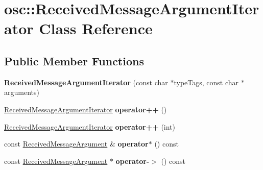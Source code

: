 \hypertarget{classosc_1_1_received_message_argument_iterator}{}\section{osc\+:\+:Received\+Message\+Argument\+Iterator Class Reference}
\label{classosc_1_1_received_message_argument_iterator}
\subsection*{Public Member Functions}
\begin{DoxyCompactItemize}
\item 
\mbox{\label{classosc_1_1_received_message_argument_iterator_ad5a73ceee1761f58729c0acd4f524b57}} 
{\bfseries Received\+Message\+Argument\+Iterator} (const char $\ast$type\+Tags, const char $\ast$arguments)
\item 
\mbox{\label{classosc_1_1_received_message_argument_iterator_a9f06fa608a4aeaf0537945ecc659f3c6}} 
\hyperlink{classosc_1_1_received_message_argument_iterator}{Received\+Message\+Argument\+Iterator} {\bfseries operator++} ()
\item 
\mbox{\label{classosc_1_1_received_message_argument_iterator_a5fc2f85a4ff96ab13eb79153582a4f37}} 
\hyperlink{classosc_1_1_received_message_argument_iterator}{Received\+Message\+Argument\+Iterator} {\bfseries operator++} (int)
\item 
\mbox{\label{classosc_1_1_received_message_argument_iterator_ad45bf6d3b1c6783ba160975bd01dee0d}} 
const \hyperlink{classosc_1_1_received_message_argument}{Received\+Message\+Argument} \& {\bfseries operator$\ast$} () const
\item 
\mbox{\label{classosc_1_1_received_message_argument_iterator_a588a50dfab91cb60301fdf9005028b72}} 
const \hyperlink{classosc_1_1_received_message_argument}{Received\+Message\+Argument} $\ast$ {\bfseries operator-\/$>$} () const
\end{DoxyCompactItemize}
